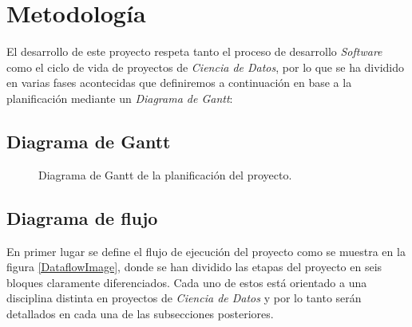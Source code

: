 
\chapter{Metodología}
\label{metodologia}

El desarrollo de este proyecto respeta tanto el proceso de desarrollo \textit{Software} como el ciclo de vida de proyectos de \textit{Ciencia de Datos}, por lo que se ha dividido en varias fases acontecidas que definiremos a continuación en base a la planificación mediante un \textit{Diagrama de Gantt}:

\section{Diagrama de Gantt}

    \begin{figure}[H]
        \centering
        
        \caption{Diagrama de Gantt de la planificación del proyecto.}
        \label{GranttImage}
    \end{figure}


\section{Diagrama de flujo}

    En primer lugar se define el flujo de ejecución del proyecto como se muestra en la figura \ref{DataflowImage}, donde se han dividido las etapas del proyecto en seis bloques claramente diferenciados. Cada uno de estos está orientado a una disciplina distinta en proyectos de \textit{Ciencia de Datos} y por lo tanto serán detallados en cada una de las subsecciones posteriores.


